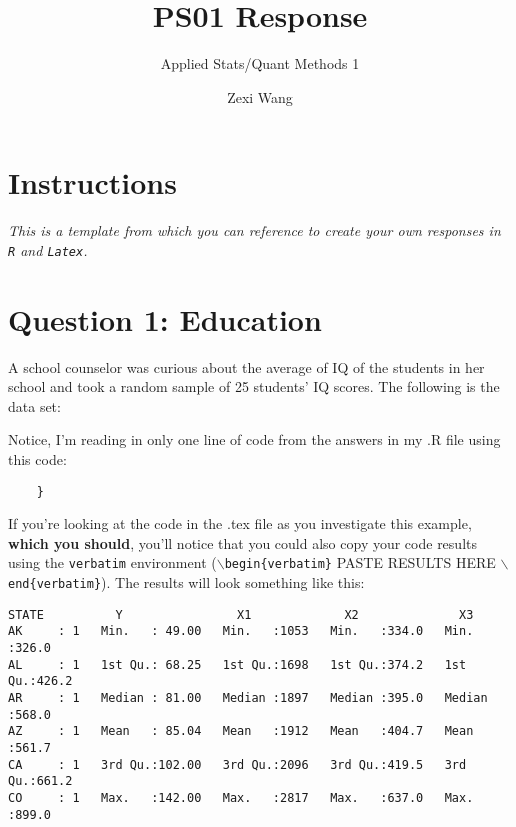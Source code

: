 \documentclass[12pt,letterpaper]{article}
\title{ PS01 Response}
\date{Zexi Wang}
\author{Applied Stats/Quant Methods 1}
\begin{document}
	\maketitle
	
	\section*{Instructions}

 \textit{This is a template from which you can reference to create your own responses in \texttt{R} and \texttt{Latex}.}

\section*{Question 1: Education }

\vspace{.25cm}

\noindent A school counselor was curious about the average of IQ of the students in her school and took a random sample of 25 students’ IQ scores. The following is the data set:\\

  

\vspace{.25cm}

\noindent Notice, I'm reading in only one line of code from the answers in my .R file using this code: 

\begin{verbatim}
	}
\end{verbatim}

\noindent If you're looking at the code in the .tex file as you investigate this example, \textbf{which you should}, you'll notice that you could also copy your code results using the \texttt{verbatim} environment (\texttt{$\backslash$begin\{verbatim\}} PASTE RESULTS HERE \texttt{$\backslash$end\{verbatim\}}). The results will look something like this:


\begin{verbatim}
STATE          Y                X1             X2              X3       
AK     : 1   Min.   : 49.00   Min.   :1053   Min.   :334.0   Min.   :326.0  
AL     : 1   1st Qu.: 68.25   1st Qu.:1698   1st Qu.:374.2   1st Qu.:426.2  
AR     : 1   Median : 81.00   Median :1897   Median :395.0   Median :568.0  
AZ     : 1   Mean   : 85.04   Mean   :1912   Mean   :404.7   Mean   :561.7  
CA     : 1   3rd Qu.:102.00   3rd Qu.:2096   3rd Qu.:419.5   3rd Qu.:661.2  
CO     : 1   Max.   :142.00   Max.   :2817   Max.   :637.0   Max.   :899.0  
\end{verbatim}
\vspace{.5cm}
\end{document}
